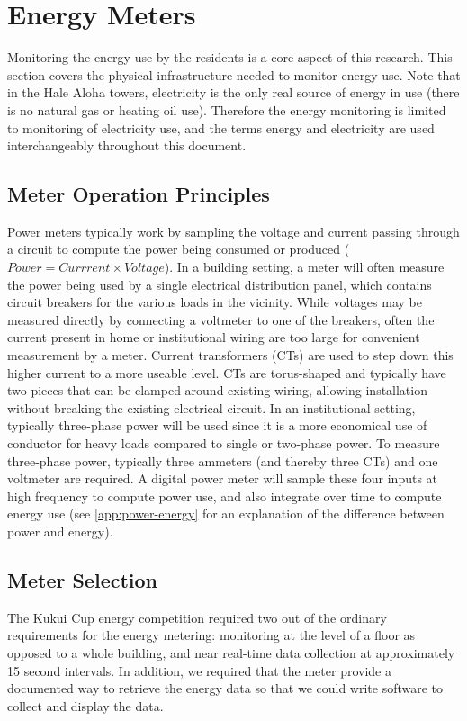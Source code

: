 \section{Energy Meters}

Monitoring the energy use by the residents is a core aspect of this research. This section covers the physical infrastructure needed to monitor energy use. Note that in the Hale Aloha towers, electricity is the only real source of energy in use (there is no natural gas or heating oil use). Therefore the energy monitoring is limited to monitoring of electricity use, and the terms energy and electricity are used interchangeably throughout this document.


\subsection{Meter Operation Principles}

Power meters typically work by sampling the voltage and current passing through a circuit to compute the power being consumed or produced ($Power = Currrent \times Voltage$). In a building setting, a meter will often measure the power being used by a single electrical distribution panel, which contains circuit breakers for the various loads in the vicinity. While voltages may be measured directly by connecting a voltmeter to one of the breakers, often the current present in home or institutional wiring are too large for convenient measurement by a meter. Current transformers (CTs) are used to step down this higher current to a more useable level. CTs are torus-shaped and typically have two pieces that can be clamped around existing wiring, allowing installation without breaking the existing electrical circuit. In an institutional setting, typically three-phase power will be used since it is a more economical use of conductor for heavy loads compared to single or two-phase power. To measure three-phase power, typically three ammeters (and thereby three CTs) and one voltmeter are required. A digital power meter will sample these four inputs at high frequency to compute power use, and also integrate over time to compute energy use (see \autoref{app:power-energy} for an explanation of the difference between power and energy).


\subsection{Meter Selection}

The Kukui Cup energy competition required two out of the ordinary requirements for the energy metering: monitoring at the level of a floor as opposed to a whole building, and near real-time data collection at approximately 15 second intervals. In addition, we required that the meter provide a documented way to retrieve the energy data so that we could write software to collect and display the data.

